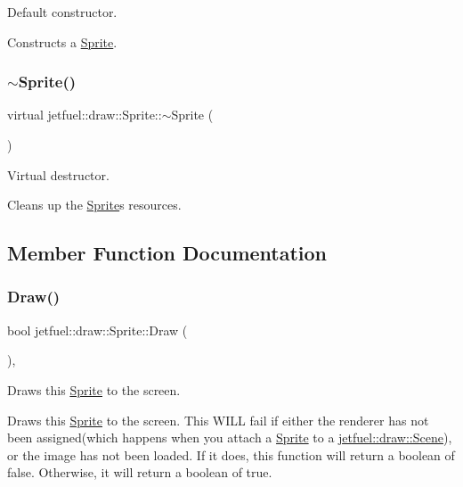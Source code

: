 Default constructor. 

Constructs a \hyperlink{classjetfuel_1_1draw_1_1Sprite}{Sprite}. \mbox{\label{classjetfuel_1_1draw_1_1Sprite_ac13ffb7365f120f4e679ed547ea704cd}} 
\subsubsection{\texorpdfstring{$\sim$\+Sprite()}{~Sprite()}}
{\footnotesize\ttfamily virtual jetfuel\+::draw\+::\+Sprite\+::$\sim$\+Sprite (\begin{DoxyParamCaption}{ }\end{DoxyParamCaption})\hspace{0.3cm}{\ttfamily [virtual]}}



Virtual destructor. 

Cleans up the \hyperlink{classjetfuel_1_1draw_1_1Sprite}{Sprite}\textquotesingle{}s resources. 

\subsection{Member Function Documentation}
\mbox{\label{classjetfuel_1_1draw_1_1Sprite_ae4e52cd12a067e67ed67d5a2a5835143}} 
\subsubsection{\texorpdfstring{Draw()}{Draw()}}
{\footnotesize\ttfamily bool jetfuel\+::draw\+::\+Sprite\+::\+Draw (\begin{DoxyParamCaption}{ }\end{DoxyParamCaption})\hspace{0.3cm}{\ttfamily [override]}, {\ttfamily [virtual]}}



Draws this \hyperlink{classjetfuel_1_1draw_1_1Sprite}{Sprite} to the screen. 

Draws this \hyperlink{classjetfuel_1_1draw_1_1Sprite}{Sprite} to the screen. This W\+I\+LL fail if either the renderer has not been assigned(which happens when you attach a \hyperlink{classjetfuel_1_1draw_1_1Sprite}{Sprite} to a \hyperlink{classjetfuel_1_1draw_1_1Scene}{jetfuel\+::draw\+::\+Scene}), or the image has not been loaded. If it does, this function will return a boolean of false. Otherwise, it will return a boolean of true. 

